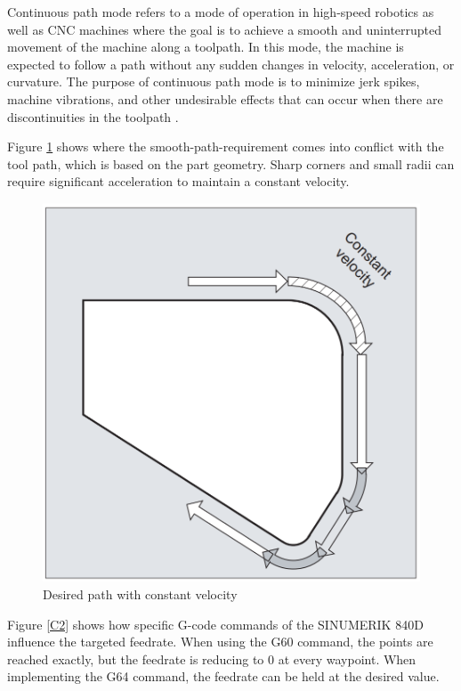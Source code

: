 Continuous path mode refers to a mode of operation in high-speed robotics as well as CNC machines where the goal is to achieve a smooth and uninterrupted movement of the machine along a toolpath. In this mode, the machine is expected to follow a path without any sudden changes in velocity, acceleration, or curvature. The purpose of continuous path mode is to minimize jerk spikes, machine vibrations, and other undesirable effects that can occur when there are discontinuities in the toolpath \cite{Jia.2018, Yang.2017}.

Figure \ref{C1} shows where the smooth-path-requirement comes into conflict with the tool path, which is based on the part geometry. Sharp corners and small radii can require significant acceleration to maintain a constant velocity. 


 \begin{figure}[H]
 	\centerline{\includegraphics[scale=.25]{figures/conti.png}}
 	\caption{Desired path with constant velocity \cite{sinumericmanual}}
 	\label{C1}
 \end{figure}
 
Figure \ref{C2} shows how specific G-code commands of the SINUMERIK 840D influence the targeted feedrate. When using the G60 command, the points are reached exactly, but the feedrate is reducing to 0 at every waypoint. When implementing the G64 command, the feedrate can be held at the desired value.
 
